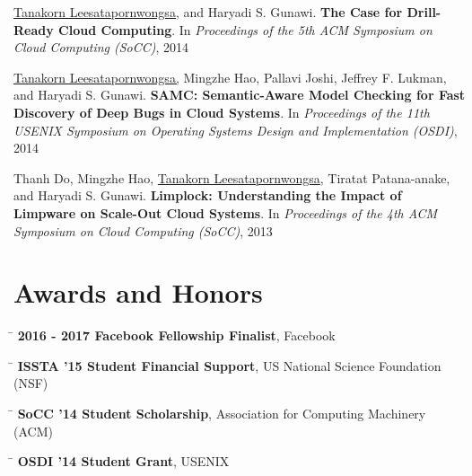 \documentclass[10pt]{article} %
\begin{document}
\underline{Tanakorn Leesatapornwongsa,} and Haryadi S. Gunawi. \textbf{The Case
for Drill-Ready Cloud Computing}. In \textit{Proceedings of the 5th ACM
Symposium on Cloud Computing (SoCC)}, 2014
\vspace{2mm}

\underline{Tanakorn Leesatapornwongsa,} Mingzhe Hao, Pallavi Joshi, Jeffrey F.
Lukman, and Haryadi S. Gunawi. \textbf{SAMC: Semantic-Aware Model Checking for
Fast Discovery of Deep Bugs in Cloud Systems}. In \textit{Proceedings of the
11th USENIX Symposium on Operating Systems Design and Implementation (OSDI)},
2014
\vspace{2mm}

Thanh Do, Mingzhe Hao, \underline{Tanakorn Leesatapornwongsa}, Tiratat
Patana-anake, and Haryadi S. Gunawi. \textbf{Limplock: Understanding the Impact
of Limpware on Scale-Out Cloud Systems}. In \textit{Proceedings of the 4th ACM
Symposium on Cloud Computing (SoCC)}, 2013


\section{Awards and Honors}

\begin{tabbing}
\hspace{2.5cm} \=  \> \textbf{2016 - 2017 Facebook Fellowship Finalist}, Facebook
\end{tabbing}

\begin{tabbing}
\hspace{2.5cm} \=  \> \textbf{ISSTA '15 Student Financial Support}, US National Science Foundation (NSF)
\end{tabbing}

\begin{tabbing}
\hspace{2.5cm} \=  \> \textbf{SoCC '14 Student Scholarship}, Association for Computing Machinery (ACM)
\end{tabbing}

\begin{tabbing}
\hspace{2.5cm} \=  \> \textbf{OSDI '14 Student Grant}, USENIX
\end{tabbing}
\end{document}

